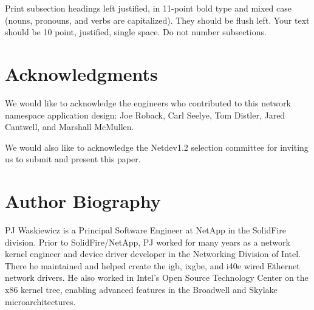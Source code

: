 \documentclass[letterpaper]{article}
\begin{document}
Print subsection headings left justified, in 11-point bold type and mixed case (nouns, pronouns, and verbs are capitalized). They should be flush left. Your text should be 10 point, justified, single space. Do not number subsections.

\section{Acknowledgments}
We would like to acknowledge the engineers who contributed to this network namespace application design: Joe Roback, Carl Seelye, Tom Distler, Jared Cantwell, and Marshall McMullen.

We would also like to acknowledge the Netdev1.2 selection committee for inviting us to submit and present this paper.




\section{Author Biography}
PJ Waskiewicz is a Principal Software Engineer at NetApp in the SolidFire division. Prior to SolidFire/NetApp, PJ worked for many years as a network kernel engineer and device driver developer in the Networking Division of Intel. There he maintained and helped create the igb, ixgbe, and i40e wired Ethernet network drivers. He also worked in Intel's Open Source Technology Center on the x86 kernel tree, enabling advanced features in the Broadwell and Skylake microarchitectures.
\end{document}
